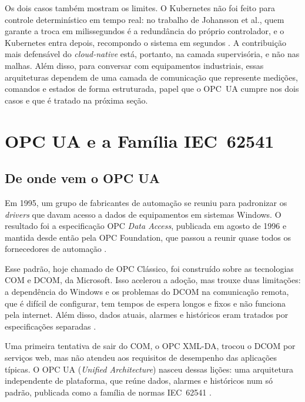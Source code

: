 Os dois casos também mostram os limites. O Kubernetes não foi feito para controle determinístico em tempo real: no trabalho de Johansson et al., quem garante a troca em milissegundos é a redundância do próprio controlador, e o Kubernetes entra depois, recompondo o sistema em segundos \cite{Johansson2022}. A contribuição mais defensável do \textit{cloud-native} está, portanto, na camada supervisória, e não nas malhas. Além disso, para conversar com equipamentos industriais, essas arquiteturas dependem de uma camada de comunicação que represente medições, comandos e estados de forma estruturada, papel que o OPC~UA cumpre nos dois casos e que é tratado na próxima seção.


\section{OPC UA e a Família IEC~62541}
\label{sec:opcua}

\subsection{De onde vem o OPC UA}

Em 1995, um grupo de fabricantes de automação se reuniu para padronizar os \textit{drivers} que davam acesso a dados de equipamentos em sistemas Windows. O resultado foi a especificação OPC \textit{Data Access}, publicada em agosto de 1996 e mantida desde então pela OPC Foundation, que passou a reunir quase todos os fornecedores de automação \cite{Mahnke2009intro}. 

Esse padrão, hoje chamado de OPC Clássico, foi construído sobre as tecnologias COM e DCOM, da Microsoft. Isso acelerou a adoção, mas trouxe duas limitações: a dependência do Windows e os problemas do DCOM na comunicação remota, que é difícil de configurar, tem tempos de espera longos e fixos e não funciona pela internet. Além disso, dados atuais, alarmes e históricos eram tratados por especificações separadas \cite{Mahnke2009intro}.

Uma primeira tentativa de sair do COM, o OPC XML-DA, trocou o DCOM por serviços web, mas não atendeu aos requisitos de desempenho das aplicações típicas. O OPC UA (\textit{Unified Architecture}) nasceu dessas lições: uma arquitetura independente de plataforma, que reúne dados, alarmes e históricos num só padrão, publicada como a família de normas IEC~62541 \cite{Mahnke2009intro, IEC62541_1}.

